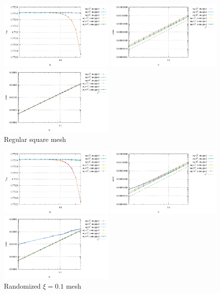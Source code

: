 \begin{center}
\includegraphics[width=5.7cm]{python_codes/fieldstone_76/results/mms2/reg/vrms}
\includegraphics[width=5.7cm]{python_codes/fieldstone_76/results/mms2/reg/errors_V}
\includegraphics[width=5.7cm]{python_codes/fieldstone_76/results/mms2/reg/errors_P}\\
{\captionfont Regular square mesh}
\end{center}

\begin{center}
\includegraphics[width=5.7cm]{python_codes/fieldstone_76/results/mms2/rand/vrms}
\includegraphics[width=5.7cm]{python_codes/fieldstone_76/results/mms2/rand/errors_V}
\includegraphics[width=5.7cm]{python_codes/fieldstone_76/results/mms2/rand/errors_P}\\
{\captionfont Randomized $\xi=0.1$ mesh}
\end{center}



